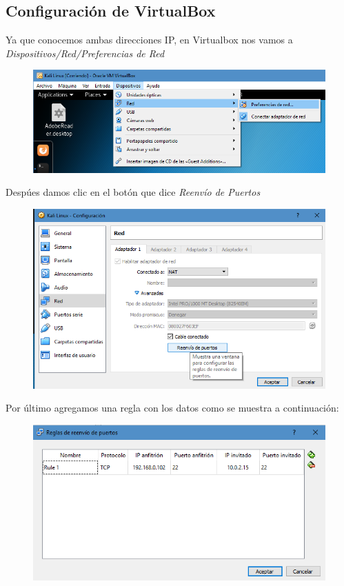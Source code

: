 \documentclass{article}
\begin{document}
\subsection{Configuraci\'on de VirtualBox}

Ya que conocemos ambas direcciones IP, en Virtualbox nos vamos a \emph{Dispositivos/Red/Preferencias de Red}

\begin{figure}[H]
\centering
\includegraphics[width=1\textwidth]{03-PREFERENCIADERED}
\end{figure}

Desp\'ues damos clic en el bot\'on que dice \emph{Reenv\'io de Puertos}

\begin{figure}[H]
\centering
\includegraphics[width=1\textwidth]{04-REENVIOPUERTOS}
\end{figure}

Por \'ultimo agregamos una regla con los datos como se muestra a continuaci\'on: 

\begin{figure}[H]
\centering
\includegraphics[width=1\textwidth]{05-CONFIGURADO}
\end{figure}
\end{document}
